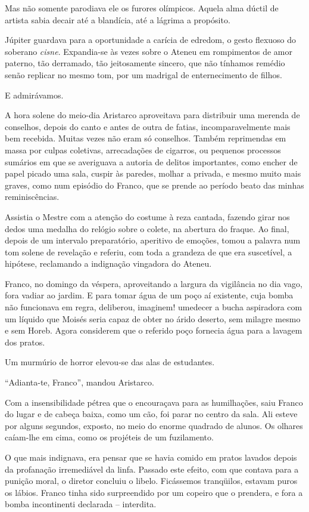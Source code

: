 Mas não somente parodiava ele os furores
olímpicos. Aquela alma dúctil de artista sabia decair até a blandícia,
até a lágrima a propósito. 

Júpiter guardava para a oportunidade a
carícia de edredom, o gesto flexuoso do soberano \textit{cisne}. Expandia{}-se
às vezes sobre o Ateneu em rompimentos de amor paterno, tão derramado,
tão jeitosamente sincero, que não tínhamos remédio senão replicar no
mesmo tom, por um madrigal de enternecimento de filhos. 

E admirávamos.

A hora solene do meio{}-dia Aristarco aproveitava para distribuir uma
merenda de conselhos, depois do canto e antes de outra de fatias,
incomparavelmente mais bem recebida. Muitas vezes não eram só
conselhos. Também reprimendas em massa por culpas coletivas,
arrecadações de cigarros, ou pequenos processos sumários em que se
averiguava a autoria de delitos importantes, como encher de papel
picado uma sala, cuspir às paredes, molhar a privada, e mesmo muito
mais graves, como num episódio do Franco, que se prende ao período
beato das minhas reminiscências. 

Assistia o Mestre com a atenção do
costume à reza cantada, fazendo girar nos dedos uma medalha do relógio
sobre o colete, na abertura do fraque. Ao final, depois de um intervalo
preparatório, aperitivo de emoções, tomou a palavra num tom solene de
revelação e referiu, com toda a grandeza de que era suscetível, a
hipótese, reclamando a indignação vingadora do Ateneu. 

Franco, no domingo da véspera, aproveitando a largura da vigilância no dia vago,
fora vadiar ao jardim. E para tomar água de um poço aí existente, cuja
bomba não funcionava em regra, deliberou, imaginem! umedecer a bucha
aspiradora com um líquido que Moisés seria capaz de obter no árido
deserto, sem milagre mesmo e sem Horeb. Agora considerem que o referido
poço fornecia água para a lavagem dos pratos. 

Um murmúrio de horror elevou{}-se das alas de estudantes. 

``Adianta{}-te, Franco'', mandou Aristarco. 

Com a insensibilidade pétrea que o encouraçava para as
humilhações, saiu Franco do lugar e de cabeça baixa, como um cão, foi
parar no centro da sala. Ali esteve por alguns segundos, exposto, no
meio do enorme quadrado de alunos. Os olhares caíam{}-lhe em cima, como
os projéteis de um fuzilamento. 

O que mais indignava, era pensar que se
havia comido em pratos lavados depois da profanação irremediável da
linfa. Passado este efeito, com que contava para a punição moral, o
diretor concluiu o libelo. Ficássemos tranqüilos, estavam puros os lábios. Franco tinha
sido surpreendido por um copeiro que o prendera, e fora a bomba
incontinenti declarada -- interdita. 

